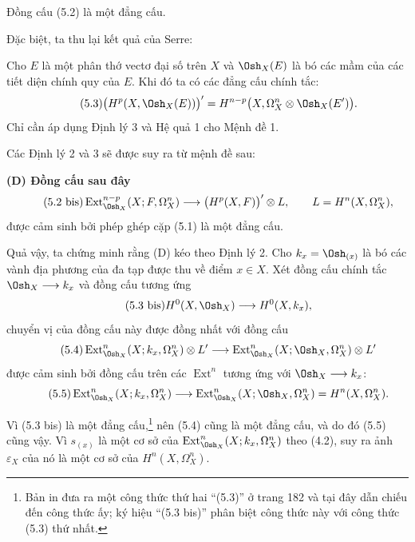  Đồng cấu (5.2) là một đẳng cấu.

Đặc biệt, ta thu lại kết quả của Serre:

 Cho $E$ là một phân thớ vectơ đại số trên $X$ và
$\Osh_X(E)$ là bó các mầm của các tiết diện chính quy của $E$. Khi đó ta có các
đẳng cấu chính tắc:
\begin{equation}\tag{5.3}
  \bigl(H^{p}(X,\Osh_X(E))\bigr)'
  =H^{n-p}\bigl(X,\Omega_X^{n}\otimes\Osh_X(E')\bigr).
\end{equation}
Chỉ cần áp dụng Định lý 3 và Hệ quả 1 cho Mệnh đề 1.

Các Định lý 2 và 3 sẽ được suy ra từ mệnh đề sau:

\noindent\textbf{(D) Đồng cấu sau đây}
\begin{equation}\tag{5.2 bis}
  \operatorname{Ext}_{\Osh_X}^{n-p}(X;F,\Omega_X^{n})
  \longrightarrow\bigl(H^{p}(X,F)\bigr)'\otimes L,
  \qquad L=H^{n}(X,\Omega_X^{n}),
\end{equation}
được cảm sinh bởi phép ghép cặp (5.1) là một đẳng cấu.

Quả vậy, ta chứng minh rằng (D) kéo theo Định lý 2. Cho
$k_x=\Osh_{(x)}$ là bó các vành địa phương của đa tạp được thu về điểm
$x\in X$. Xét đồng cấu chính tắc
$\Osh_X\longrightarrow k_x$ và đồng cấu tương ứng
\begin{equation}\tag{5.3 bis}
  H^{0}(X,\Osh_X)\longrightarrow H^{0}(X,k_x),
\end{equation}
chuyển vị của đồng cấu này được đồng nhất với đồng cấu
\begin{equation}\tag{5.4}
  \operatorname{Ext}_{\Osh_X}^{n}(X;k_x,\Omega_X^{n})\otimes L'
  \longrightarrow
  \operatorname{Ext}_{\Osh_X}^{n}(X;\Osh_X,\Omega_X^{n})\otimes L'
\end{equation}
được cảm sinh bởi đồng cấu trên các $\operatorname{Ext}^{n}$ tương ứng với
$\Osh_X\longrightarrow k_x$:
\begin{equation}\tag{5.5}
  \operatorname{Ext}_{\Osh_X}^{n}(X;k_x,\Omega_X^{n})
  \longrightarrow
  \operatorname{Ext}_{\Osh_X}^{n}(X;\Osh_X,\Omega_X^{n})
  =H^{n}(X,\Omega_X^{n}).
\end{equation}

Vì (5.3 bis) là một đẳng cấu,\footnote{Bản in đưa ra một công thức thứ hai
``(5.3)'' ở trang 182 và tại đây dẫn chiếu đến công thức ấy; ký hiệu
``(5.3 bis)'' phân biệt công thức này với công thức (5.3) thứ nhất.} nên
(5.4) cũng là một đẳng cấu, và do đó (5.5) cũng vậy. Vì $s_{(x)}$ là một cơ
sở của $\operatorname{Ext}_{\Osh_X}^{n}(X;k_x,\Omega_X^{n})$ theo (4.2), suy
ra ảnh $\varepsilon_X$ của nó là một cơ sở của
$H^{n}(X,\Omega_X^{n})$.

